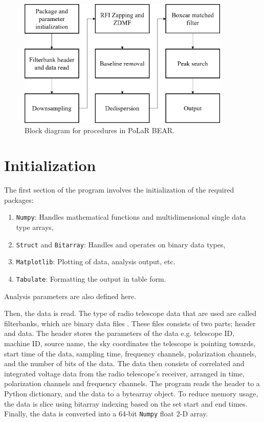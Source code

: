 \begin{figure}[h]
    \vspace{1em}
    \centering
    \includegraphics[width=0.9\textwidth]{Images/flowbear.png}
    \vspace{0.5em}
    \caption{Block diagram for procedures in PoLaR BEAR.}
    \label{fig:flowbear}
\end{figure}

\section{Initialization}

The first section of the program involves the initialization of the required packages:
\begin{enumerate}
    \item \texttt{Numpy}: Handles mathematical functions and multidimensional single data type arrays,
    \item \texttt{Struct} and \texttt{Bitarray}: Handles and operates on binary data types,
    \item \texttt{Matplotlib}: Plotting of data, analysis output, etc.
    \item \texttt{Tabulate}: Formatting the output in table form.
\end{enumerate}
Analysis parameters are also defined here. 

Then, the data is read. The type of radio telescope data that are used are called filterbanks, which are binary data files \cite{Lorimersigproc}. These files consists of two parts; header and data. The header stores the parameters of the data e.g. telescope ID, machine ID, source name, the sky coordinates the telescope is pointing towards, start time of the data, sampling time, frequency channels, polarization channels, and the number of bits of the data. The data then consists of correlated and integrated voltage data from the radio telescope's receiver, arranged in time, polarization channels and frequency channels. The program reads the header to a Python dictionary, and the data to a bytearray object. To reduce memory usage, the data is slice using bitarray indexing based on the set start and end times. Finally, the data is converted into a 64-bit \texttt{Numpy} float 2-D array.

